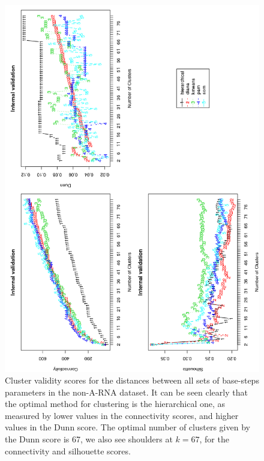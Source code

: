 \begin{figure}
 \centering
\includegraphics[angle=0, scale=0.72]{Chapter2/noarna_val.png}
\caption{Cluster validity scores for the distances between all sets of
  base-steps  parameters in  the non-A-RNA  dataset.  It  can  be seen
  clearly that  the optimal method for clustering  is the hierarchical
  one, as  measured by  lower values in  the connectivity  scores, and
  higher values  in the  Dunn score.  The  optimal number  of clusters
  given by the Dunn score is  67, we also see shoulders at $k=67$, for
  the connectivity and silhouette scores.}
 \label{fig:noarna}
\end{figure}

